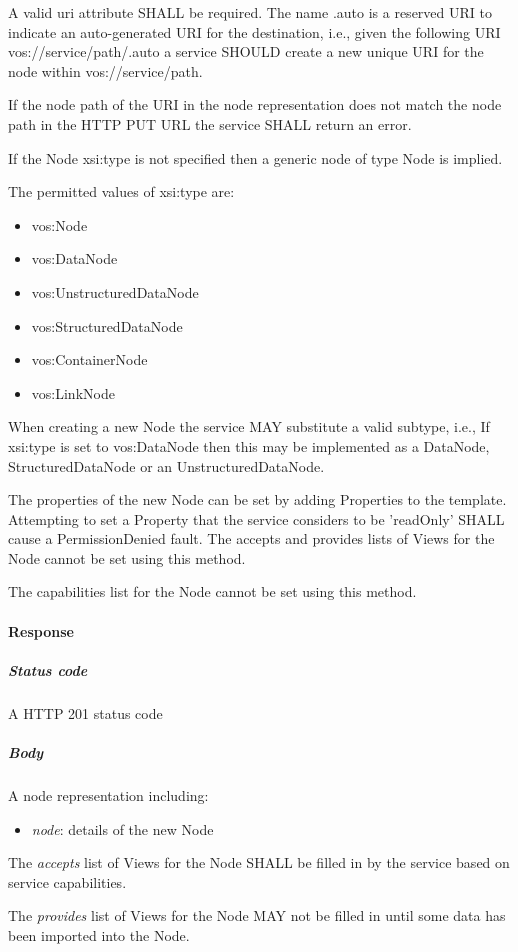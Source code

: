 \documentclass[11pt,a4paper]{ivoa}
\begin{document}
A valid uri attribute SHALL be required. The name .auto is a reserved URI to indicate an auto-generated URI for the destination, i.e., given the following URI vos://service/path/.auto a service SHOULD create a new unique URI for the node within vos://service/path.

If the node path of the URI in the node representation does not match the node path in the HTTP PUT URL the service SHALL return an error.

If the Node xsi:type is not specified then a generic node of type Node is implied.

The permitted values of xsi:type are:

\begin{itemize}
    \item vos:Node
    \item vos:DataNode
    \item vos:UnstructuredDataNode
    \item vos:StructuredDataNode
    \item vos:ContainerNode
    \item vos:LinkNode
\end{itemize}

When creating a new Node the service MAY substitute a valid subtype, i.e., If xsi:type is set to vos:DataNode then this may be implemented as a DataNode, StructuredDataNode or an UnstructuredDataNode.

The properties of the new Node can be set by adding Properties to the template. Attempting to set a Property that the service considers to be 'readOnly' SHALL cause a PermissionDenied fault. The accepts and provides lists of Views for the Node cannot be set using this method.

The capabilities list for the Node cannot be set using this method.

\paragraph{Response}
\subparagraph{Status code} A HTTP 201 status code
\subparagraph{Body}
A node representation including:
\begin{itemize}
    \item \emph{node}: details of the new Node
\end{itemize}

The \emph{accepts} list of Views for the Node SHALL be filled in by the service based on service capabilities.

The \emph{provides} list of Views for the Node MAY not be filled in until some data has been imported into the Node.
\end{document}
